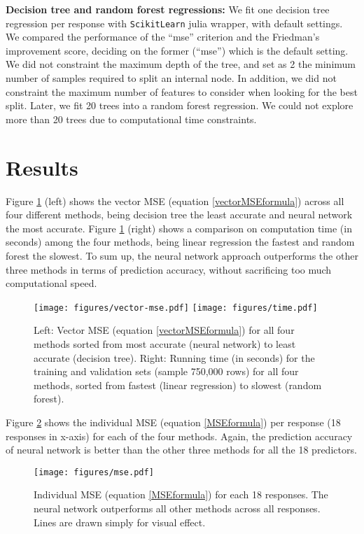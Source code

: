 \documentclass[graybox]{svmult}
\begin{document}
\vspace{0.25cm}
\noindent \textbf{Decision tree and random forest regressions:} We fit one decision tree
regression per response with \texttt{ScikitLearn} julia wrapper, with default
settings. We compared the performance of the ``mse'' criterion and the
Friedman's improvement score, deciding on the former (``mse'') which
is the default setting. We did not constraint the maximum depth of the
tree, and set as 2 the minimum number of samples required to split an
internal node. In addition, we did not constraint the maximum number
of features to consider when looking for the best split. Later, we fit
20 trees into a random forest regression. We could not explore more than 20
trees due to computational time constraints.



\section{Results}

Figure \ref{vectorMSE} (left) shows the vector MSE (equation
\ref{vectorMSEformula}) across all four different methods, being
decision tree the least accurate and neural network the most
accurate. Figure \ref{vectorMSE} (right) shows a comparison on
computation time (in seconds) among the four methods, being linear
regression the fastest and random forest the slowest. To sum up, the
neural network approach outperforms the other three methods in terms
of prediction accuracy, without sacrificing too much computational
speed.


\begin{figure}
\centering
\texttt{[image: figures/vector-mse.pdf]}
\texttt{[image: figures/time.pdf]}
\caption{Left: Vector MSE (equation \ref{vectorMSEformula}) for all
  four methods sorted from most accurate (neural network) to least
  accurate (decision tree). Right: Running time (in seconds) for the
  training and validation sets (sample 750,000 rows) for all four
  methods, sorted from fastest (linear regression) to slowest (random
  forest).}
\label{vectorMSE}
\end{figure}


Figure \ref{MSE} shows the individual MSE (equation \ref{MSEformula})
per response (18 responses in x-axis) for each of the four
methods. Again, the prediction accuracy of neural network is better
than the other three methods for all the 18 predictors.

\begin{figure}
\centering
\texttt{[image: figures/mse.pdf]}
\caption{Individual MSE (equation \ref{MSEformula}) for each 18
  responses. The neural network outperforms all other methods across
  all responses.  Lines are drawn simply for visual effect.}
\label{MSE}
\end{figure}
\end{document}
